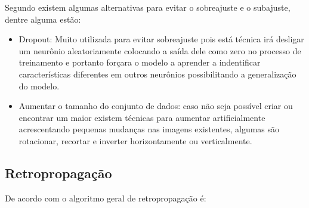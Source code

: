 Segundo  existem algumas alternativas para evitar o sobreajuste e o subajuste, dentre alguma estão:

\begin{itemize}
    \item Dropout: Muito utilizada para evitar sobreajuste pois está técnica irá desligar um neurônio aleatoriamente colocando a saída dele como zero no processo de treinamento e portanto forçara o modelo a aprender a indentificar características diferentes em outros neurônios possibilitando a generalização do modelo.
    \item Aumentar o tamanho do conjunto de dados: caso não seja possível criar ou encontrar um maior existem técnicas para aumentar artificialmente acrescentando pequenas mudanças nas imagens existentes, algumas são rotacionar, recortar e inverter horizontamente ou verticalmente.
\end{itemize}

\subsection*{Retropropagação}
De acordo com  o algoritmo geral de retropropagação é:

